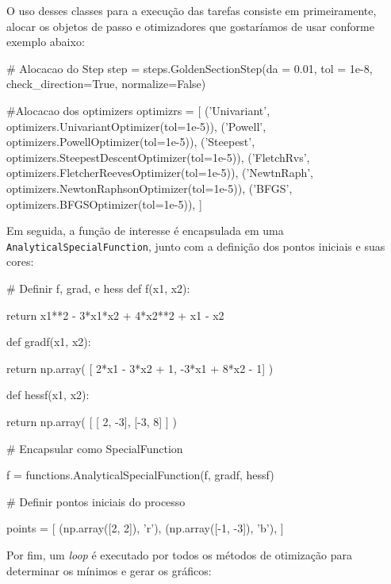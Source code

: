 \documentclass[10pt, a4paper]{article}
\begin{document}
O uso desses classes para a execução das tarefas consiste em primeiramente, alocar os objetos de passo e otimizadores que gostaríamos de usar conforme exemplo abaixo:

\begin{python}
# Alocacao do Step
step = steps.GoldenSectionStep(da = 0.01, tol = 1e-8, check_direction=True, normalize=False)

#Alocacao dos optimizers
optimizrs = [
    ('Univariant', optimizers.UnivariantOptimizer(tol=1e-5)),
    ('Powell', optimizers.PowellOptimizer(tol=1e-5)),
    ('Steepest', optimizers.SteepestDescentOptimizer(tol=1e-5)),
    ('FletchRvs', optimizers.FletcherReevesOptimizer(tol=1e-5)),
    ('NewtnRaph', optimizers.NewtonRaphsonOptimizer(tol=1e-5)),
    ('BFGS', optimizers.BFGSOptimizer(tol=1e-5)),
]
\end{python}

Em seguida, a função de interesse é encapsulada em uma {\tt AnalyticalSpecialFunction}, junto com a definição
dos pontos iniciais e suas cores:

\begin{python}
# Definir f, grad, e hess
def f(x1, x2):

return x1**2 - 3*x1*x2 + 4*x2**2 + x1 - x2

def gradf(x1, x2):

return np.array(
    [ 2*x1 - 3*x2 + 1, 
    -3*x1 + 8*x2 - 1]
)

def hessf(x1, x2):

return np.array(
    [
    [ 2, -3],
    [-3,  8]
    ]
)

# Encapsular como SpecialFunction

f = functions.AnalyticalSpecialFunction(f, gradf, hessf)

# Definir pontos iniciais do processo

points = [
(np.array([2, 2]), 'r'),
(np.array([-1, -3]), 'b'),
]
\end{python}

Por fim, um \textit{loop} é executado por todos os métodos de otimização para determinar os 
mínimos e gerar os gráficos:
\end{document}

